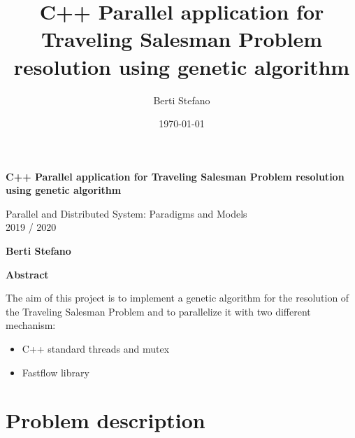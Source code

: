 \documentclass{article}
\title{C++ Parallel application for Traveling Salesman Problem resolution using genetic algorithm}
\author{Berti Stefano}
\date{\today}
\begin{document}
    \thispagestyle{plain}
    \begin{center}
        \Large
        \textbf{C++ Parallel application for Traveling Salesman Problem resolution using genetic algorithm}

        \vspace{0.4cm}
        \large Parallel and Distributed System: Paradigms and Models
        \\2019 / 2020

        \vspace{0.4cm}
        \textbf{Berti Stefano}

        \vspace{0.9cm}
        \textbf{Abstract}
    \end{center}
    The aim of this project is to implement a genetic algorithm for the resolution of the Traveling Salesman Problem and to parallelize it with two different mechanism:
    \begin{itemize}
	\item C++ standard threads and mutex
	\item Fastflow library
    \end{itemize}
    \section{Problem description}\label{sec:s1}
\end{document}
